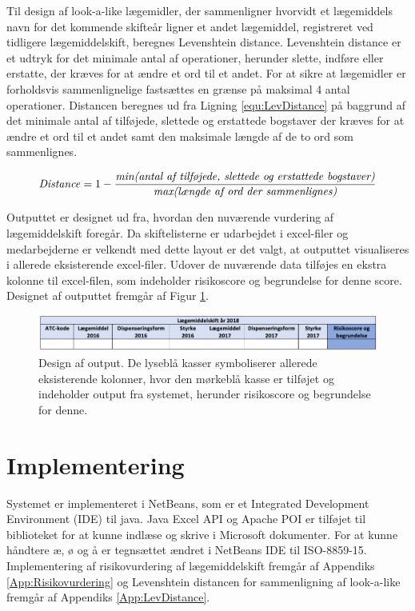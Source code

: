 Til design af look-a-like lægemidler, der sammenligner hvorvidt et lægemiddels navn for det kommende skifteår ligner et andet lægemiddel, registreret ved tidligere lægemiddelskift, beregnes Levenshtein distance. Levenshtein distance er et udtryk for det minimale antal af operationer, herunder slette, indføre eller erstatte, der kræves for at ændre et ord til et andet. For at sikre at lægemidler er forholdsvis sammenlignelige fastsættes en grænse på maksimal 4 antal operationer. Distancen beregnes ud fra Ligning \ref{equ:LevDistance} på baggrund af det minimale antal af tilføjede, slettede og erstattede bogstaver der kræves for at ændre et ord til et andet samt den maksimale længde af de to ord som sammenlignes. 

\begin{equation} \label{equ:LevDistance}
\mbox{\textit{Distance}} = 1 - \frac{\mbox{\textit{min(antal af tilføjede, slettede og erstattede bogstaver)}}}{\mbox{\textit{max(længde af ord der sammenlignes)}}}   
\end{equation}

Outputtet er designet ud fra, hvordan den nuværende vurdering af lægemiddelskift foregår. Da skiftelisterne er udarbejdet i excel-filer og medarbejderne er velkendt med dette layout er det valgt, at outputtet visualiseres i allerede eksisterende excel-filer. Udover de nuværende data tilføjes en ekstra kolonne til excel-filen, som indeholder risikoscore og begrundelse for denne score. Designet af outputtet fremgår af Figur \ref{fig:Output}.

\vspace{0.2cm}
\begin{figure}[H]\centering
\includegraphics[width=1\textwidth]{billeder/Output.png} 
	\caption{Design af output. De lyseblå kasser symboliserer allerede eksisterende kolonner, hvor den mørkeblå kasse er tilføjet og indeholder output fra systemet, herunder risikoscore og begrundelse for denne.}
	\label{fig:Output}  
\end{figure}

\newpage
\section{Implementering}
Systemet er implementeret i NetBeans, som er et Integrated Development Environment (IDE) til java.  Java Excel API og Apache POI er tilføjet til biblioteket for at kunne indlæse og skrive i Microsoft dokumenter. For at kunne håndtere æ, ø og å er tegnsættet ændret i NetBeans IDE til ISO-8859-15. Implementering af risikovurdering af lægemiddelskift fremgår af Appendiks \ref{App:Risikovurdering} og Levenshtein distancen for sammenligning af look-a-like fremgår af Appendiks \ref{App:LevDistance}.


